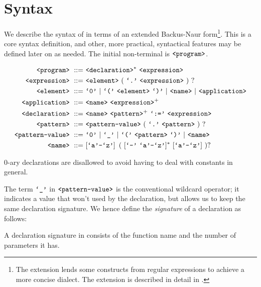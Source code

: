 \section{Syntax}\label{section:d-syntax}

We describe the syntax of \D{} in terms of an extended Backus-Naur
form\footnote{The extension lends some constructs from regular expressions to
achieve a more concise dialect. The extension is described in detail in
.}. This is a core syntax definition, and other, more
practical, syntactical features may be defined later on as needed. The initial
non-terminal is $\text{{\ttfamily<program>}}$.

\begin{align}
\nonterm{program}\ ::=&\ \nonterm{declaration}^*\ \nonterm{expression}\\
\nonterm{expression}\ ::=&\ \nonterm{element}\ (\ \term{.}\ \nonterm{expression}
\ )\ ?\\
\nonterm{element}\ ::=&\ \term{0}\ |\ \term{(}\ \nonterm{element}\ \term{)}\ |
\ \nonterm{name}\ |\ \nonterm{application}\\
\nonterm{application}\ ::=&\ \nonterm{name}
\ \nonterm{expression}^+\\
\nonterm{declaration}\ ::=&\ \nonterm{name}\ \nonterm{pattern}^+
\ \term{:=}\ \nonterm{expression}\\
\nonterm{pattern}\ ::=&\ \nonterm{pattern-value}\ (\ \term{.}
\ \nonterm{pattern}\ )\ ?\\
\nonterm{pattern-value}\ ::=&\ \term{0}\ |\ \term{\_}\ |\ \term{(}
\ \nonterm{pattern}\ \term{)}\ |\ \nonterm{name}\\
\nonterm{name}\ ::=&\ [\term{a}\mathmono{-}\term{z}]
\ \left (\ [\term{-}\ \term{a}\mathmono{-}\term{z}]^*
\ [\term{a}\mathmono{-}\term{z}]\ \right )?
\end{align}

0-ary declarations are disallowed to avoid having to deal with constants in
general.

The term $\text{{\ttfamily`\_'}}$ in $\text{{\ttfamily<pattern-value>}}$ is the conventional wildcard
operator; it indicates a value that won't used by the declaration, but allows
us to keep the same declaration signature. We hence define the \emph{signature}
of a declaration as follows:

\begin{definition}

A declaration signature in \D{} consists of the function name and the number of
parameters it has.

\end{definition}


